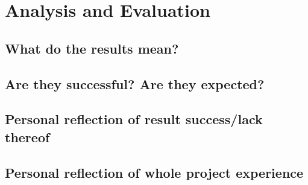 \chapter{Analysis and Evaluation}

\section{What do the results mean?}

\section{Are they successful? Are they expected?}

\section{Personal reflection of result success/lack thereof}

\section{Personal reflection of whole project experience}
